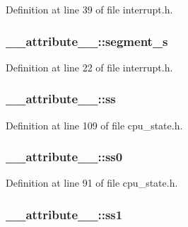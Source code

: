 \-Definition at line 39 of file interrupt.\-h.

\hypertarget{struct____attribute_____acac2f45895dfdea4f6e2f24cd4da7f78}{
\subsubsection[{segment\-\_\-s}]{ {\bf \-\_\-\-\_\-attribute\-\_\-\-\_\-\-::segment\-\_\-s}}}\label{struct____attribute_____acac2f45895dfdea4f6e2f24cd4da7f78}


\-Definition at line 22 of file interrupt.\-h.

\hypertarget{struct____attribute_____a5a9877dfc563eac292e2c217c2706ce8}{
\subsubsection[{ss}]{ {\bf \-\_\-\-\_\-attribute\-\_\-\-\_\-\-::ss}}}\label{struct____attribute_____a5a9877dfc563eac292e2c217c2706ce8}


\-Definition at line 109 of file cpu\-\_\-state.\-h.

\hypertarget{struct____attribute_____aaf7bbb9493112263c8abbc63e8abe07e}{
\subsubsection[{ss0}]{ {\bf \-\_\-\-\_\-attribute\-\_\-\-\_\-\-::ss0}}}\label{struct____attribute_____aaf7bbb9493112263c8abbc63e8abe07e}


\-Definition at line 91 of file cpu\-\_\-state.\-h.

\hypertarget{struct____attribute_____a2b5cbdbb50182726566b5ec9a3fd4003}{
\subsubsection[{ss1}]{ {\bf \-\_\-\-\_\-attribute\-\_\-\-\_\-\-::ss1}}}\label{struct____attribute_____a2b5cbdbb50182726566b5ec9a3fd4003}


